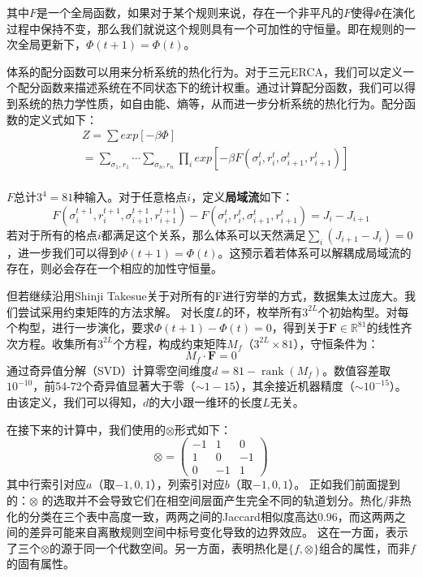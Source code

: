 \documentclass[reprint, amsmath, amssymb, aps, physrev,prb]{revtex4-2}
\begin{document}
其中$F$是一个全局函数，如果对于某个规则来说，存在一个非平凡的$F$使得$\Phi$在演化过程中保持不变，那么我们就说这个规则具有一个可加性的守恒量。即在规则的一次全局更新下，$\Phi(t+1)=\Phi(t)$。

体系的配分函数可以用来分析系统的热化行为。对于三元ERCA，我们可以定义一个配分函数来描述系统在不同状态下的统计权重。通过计算配分函数，我们可以得到系统的热力学性质，如自由能、熵等，从而进一步分析系统的热化行为。配分函数的定义式如下：
\begin{equation}
    \begin{aligned}
    &Z = \sum exp[-\beta \Phi] \\
    &= \sum_{\sigma_1 , r_1} \cdots \sum_{\sigma_n , r_n} \prod_{i} exp[-\beta F(\sigma_i^t , r_i^t , \sigma_{i+1}^t , r_{i+1}^t)]\\
    \end{aligned}
\end{equation}

$F$总计$3^4=81$种输入。对于任意格点$i$，定义\textbf{局域流}如下：
\begin{equation}
    F(\sigma_i^{t+1} , r_i^{t+1} , \sigma_{i+1}^{t+1} , r_{i+1}^{t+1})-F(\sigma_i^t , r_i^t , \sigma_{i+1}^t , r_{i+1}^t)= J_i - J_{i+1}
\end{equation}
若对于所有的格点$i$都满足这个关系，那么体系可以天然满足$\sum_i (J_{i+1}-J_{i}) = 0$，进一步我们可以得到$\Phi(t+1)=\Phi(t)$。这预示着若体系可以解耦成局域流的存在，则必会存在一个相应的加性守恒量。

但若继续沿用Shinji Takesue\cite{shinjin}关于对所有的F进行穷举的方式，数据集太过庞大。我们尝试采用约束矩阵的方法求解。
对长度$L$的环，枚举所有$3^{2L}$个初始构型。对每个构型，进行一步演化，要求$\Phi(t+1) - \Phi(t) = 0$，得到关于$\mathbf{F} \in \mathbb{R}^{81}$的线性齐次方程。收集所有$3^{2L}$个方程，构成约束矩阵$M_f$（$3^{2L} \times 81$），守恒条件为：
\begin{equation}
    M_f \cdot \mathbf{F} = 0
\end{equation}
通过奇异值分解（SVD）计算零空间维度$d = 81 - \operatorname{rank}(M_f)$。数值容差取$10^{-10}$，前54-72个奇异值显著大于零（$\sim 1-15$），其余接近机器精度（$\sim 10^{-15}$）。由该定义，我们可以得知，$d$的大小跟一维环的长度$L$无关。

在接下来的计算中，我们使用的$\otimes$形式如下：
\begin{equation}
\otimes = \begin{pmatrix}
-1 & 1 & 0 \\
1 & 0 & -1 \\
0 & -1 & 1
\end{pmatrix}
\end{equation}
其中行索引对应$a$（取$-1,0,1$），列索引对应$b$（取$-1,0,1$）。
正如我们前面提到的：$\otimes$ 的选取并不会导致它们在相空间层面产生完全不同的轨道划分。热化/非热化的分类在三个表中高度一致，两两之间的Jaccard相似度高达0.96\cite{jaccard}，而这两两之间的差异可能来自离散规则空间中标号变化导致的边界效应。
这在一方面，表示了三个$\otimes$的源于同一个代数空间。另一方面，表明热化是$\{f, \otimes\}$组合的属性，而非$f$的固有属性。
\end{document}
